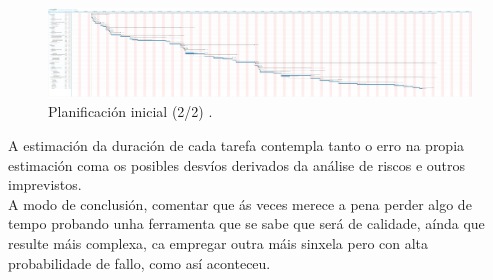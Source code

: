 \begin{figure}[htbp]
 \centering
 \includegraphics[trim=0 5cm 230cm 31cm,clip=true,scale=0.6,keepaspectratio=true]{./imagenes/planificacion-inicial.png}
 \caption[Planificación inicial (2/2)]{Planificación inicial (2/2) \cite{LibrePlan}.}
 \label{figura:PlanificacionInicial2}
\end{figure}

A estimación da duración de cada tarefa contempla tanto o erro na propia
estimación coma os posibles desvíos derivados da análise de riscos e outros
imprevistos.\\

A modo de conclusión, comentar que ás veces merece a pena perder algo de tempo
probando unha ferramenta que se sabe que será de calidade, aínda que resulte
máis complexa, ca empregar outra máis sinxela pero con alta probabilidade de
fallo, como así aconteceu.